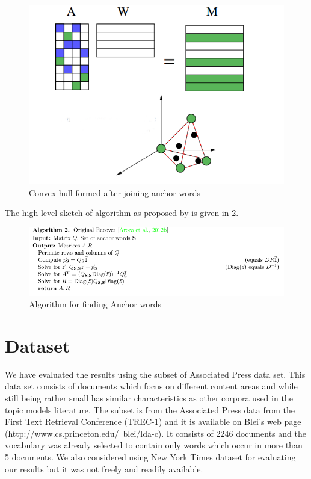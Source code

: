 \documentclass[a4paper,11pt]{article}
\begin{document}
\begin{figure}[htb]
\includegraphics[scale=0.4]{convexhull.png}
\caption{Convex hull formed after joining anchor words \cite{tm}}
\label{fig:convexhull}
\end{figure}
The high level sketch of algorithm as proposed by \cite{tm} is given in \ref{fig:algorithm}.

\begin{figure}[htb]
\includegraphics[scale=0.5]{algorithm.png}
\caption{Algorithm for finding Anchor words }
\label{fig:algorithm}
\end{figure}

\section{Dataset}
We have evaluated the results using the subset of Associated Press data set. This data set consists of documents which focus on different content areas and while still being rather small has similar characteristics as other corpora used in the topic models literature. The subset is from the Associated Press data from the First Text Retrieval Conference (TREC-1) and it is available on Blei's web page (http://www.cs.princeton.edu/~blei/lda-c). It consists of 2246 documents and the vocabulary was already selected to contain only words which occur in more than 5 documents. We also considered using New York Times dataset for evaluating our results but it was not freely and readily available.
\end{document}
